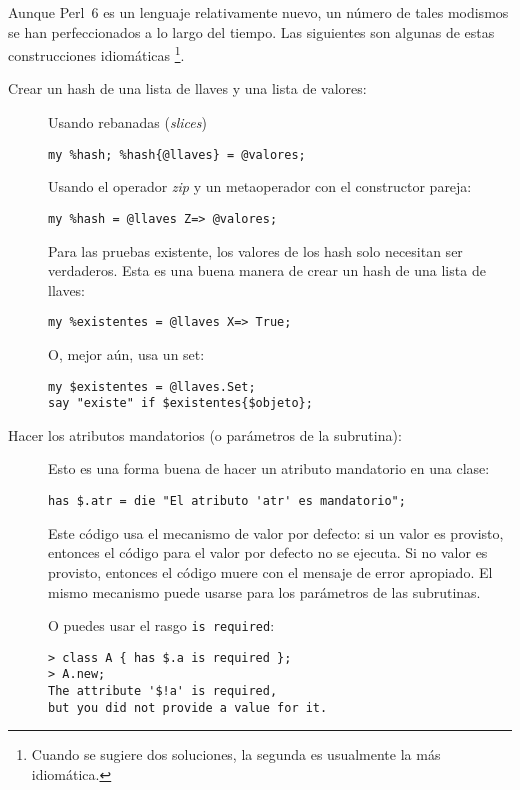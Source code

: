 Aunque Perl~6 es un lenguaje relativamente nuevo, un número de
tales modismos se han perfeccionados a lo largo del tiempo. 
Las siguientes son algunas de estas construcciones idiomáticas
\footnote{Cuando se sugiere dos soluciones,
	la segunda es usualmente la más idiomática.}.


\begin{description}
\item[Crear un hash de una lista de llaves y una lista de valores:] 

Usando rebanadas (\emph{slices})
\begin{verbatim}
my %hash; %hash{@llaves} = @valores;
\end{verbatim}

Usando el operador \emph{zip} y un metaoperador con el constructor pareja:

\begin{verbatim}
my %hash = @llaves Z=> @valores;
\end{verbatim}

Para las pruebas existente, los valores de los hash solo necesitan ser 
verdaderos. Esta es una buena manera de crear un hash de una lista de
llaves:
\begin{verbatim}
my %existentes = @llaves X=> True;
\end{verbatim}

O, mejor aún, usa un set:
\begin{verbatim}
my $existentes = @llaves.Set;
say "existe" if $existentes{$objeto};
\end{verbatim}

\item[Hacer los atributos mandatorios (o parámetros de la subrutina):]
Esto es una forma buena de hacer un atributo mandatorio en una clase:
\begin{verbatim}
has $.atr = die "El atributo 'atr' es mandatorio";
\end{verbatim}
Este código usa el mecanismo de valor por defecto: si un valor es 
provisto, entonces el código para el valor por defecto no se ejecuta.
Si no valor es provisto, entonces el código muere con el mensaje 
de error apropiado. El mismo mecanismo puede usarse para los
parámetros de las subrutinas.

O puedes usar el rasgo \verb|is required|:

\begin{verbatim}
> class A { has $.a is required }; 
> A.new;
The attribute '$!a' is required, 
but you did not provide a value for it.
\end{verbatim}


\end{description}
